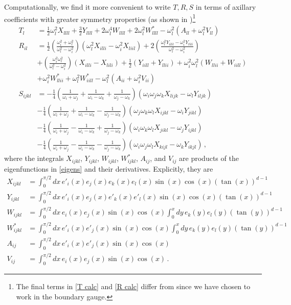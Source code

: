 \documentclass[letterpaper,11pt]{article}
\newcommand{\oi}{\omega_i}
\newcommand{\oj}{\omega_j}
\newcommand{\ok}{\omega_k}
\newcommand{\ol}{\omega_l}
\begin{document}
Computationally, we find it more convenient to write $T, R, S$ in terms of axillary coefficients with greater symmetry properties (as shown in \cite{1508.04943})\footnote{The final terms in \eqref{T calc} and \eqref{R calc} differ from \cite{1508.04943} since we have chosen to work in the boundary gauge.}
\begin{align}
\label{T calc}
T_l &= \frac{1}{2} \ol^2 X_{llll} + \frac{3}{2} Y_{llll} + 2\omega_l^4 W_{llll} + 2\omega_l^2 W^*_{llll} - \omega_l^2 (A_{ll} + \omega_l^2 V_{ll} ) \\
\label{R calc}
R_{il} &=\frac{1}{2} \left(\frac{\oi^2 + \ol^2}{\ol^2 - \oi^2}\right) (\omega_l^2 X_{illi} - \omega_i^2 X_{liil}) + 2\left(\frac{\ol^2 Y_{ilil} - \oi^2 Y_{lili}}{\ol^2 - \oi^2} \right) \nonumber \\
&+ \left(\frac{\oi^2 \ol^2}{\ol^2 - \oi^2}\right) (X_{illi} - X_{lili}) + \frac{1}{2} (Y_{iill} + Y_{llii}) + \oi^2 \ol^2 (W_{llii} + W_{iill}) \nonumber \\
&+ \oi^2 W^*_{llii} + \ol^2 W^*_{iill} - \ol^2 (A_{ii} + \omega_i^2 V_{ii} ) \\
\label{S calc}
S_{ijkl} &= -\frac{1}{4} \left( \frac{1}{\omega_i + \omega_j} + \frac{1}{\omega_i - \omega_k} + \frac{1}{\omega_j - \omega_k} \right) (\omega_i \omega_j \omega_k X_{lijk} - \omega_l Y_{iljk}) \nonumber \\
& - \frac{1}{4} \left( \frac{1}{\omega_i + \omega_j} +\frac{1}{\omega_i - \omega_k} - \frac{1}{\omega_j - \omega_k} \right) (\oj \ok \ol X_{ijkl} - \oi Y_{jikl} ) \nonumber \\
& -\frac{1}{4} \left( \frac{1}{\oi + \oj} - \frac{1}{\oi - \ok} + \frac{1}{\oj -\ok} \right) (\oi \ok \ol X_{jikl} - \oj Y_{ijkl} ) \nonumber \\
& -\frac{1}{4} \left( \frac{1}{\oi + \oj} - \frac{1}{\oi - \ok} - \frac{1}{\oj - \ok} \right) (\oi \oj \ol X_{kijl} - \ok Y_{ikjl}) \, ,
\end{align}
where the integrals $X_{ijkl}$, $Y_{ijkl}$, $W_{ijkl}$, $W^*_{ijkl}$, $A_{ij}$, and $V_{ij}$ are products of the eigenfunctions in \eqref{eigens} and their derivatives. Explicitly, they are
\begin{align}
\label{X int}
X_{ijkl} &= \int^{\pi/2}_0 dx \, e'_i(x) e_j(x) e_k(x) e_l(x) \sin(x) \cos(x) \left( \tan(x) \right)^{d-1} \\
\label{Y int}
Y_{ijkl} &= \int^{\pi/2}_0 dx \, e'_i(x) e_j(x) e'_k(x) e'_l(x) \sin(x) \cos(x) \left( \tan(x) \right)^{d-1} \\
\label{W int}
W_{ijkl} &= \int^{\pi/2}_0 dx \, e_i(x) e_j(x) \sin(x) \cos(x) \int^x_0 dy \, e_k(y) e_l(y) \left( \tan(y) \right)^{d-1} \\
\label{W* int}
W^*_{ijkl} &= \int^{\pi/2}_0 dx \, e'_i(x) e'_j(x) \sin(x) \cos(x) \int^x_0 dy \, e_k(y) e_l(y) \left( \tan(y) \right)^{d-1} \\
\label{A int}
A_{ij} &= \int^{\pi/2}_0 dx \, e'_i(x) e'_j(x) \sin(x) \cos(x) \\
\label{V int}
V_{ij} &= \int^{\pi/2}_0 dx \, e_i(x) e_j(x) \sin(x) \cos(x) \, .
\end{align}
\end{document}

